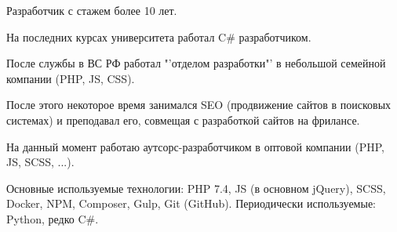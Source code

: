 \documentclass[10pt]{tpl/developercv} %
\begin{document}
\vspace{0.5cm}




\begin{minipage}[t]{0.45\textwidth} %
	\vspace{-\baselineskip} %

	Разработчик с стажем более 10 лет.
  \bigskip

  На последних курсах университета работал C\# разработчиком.

  После службы в ВС РФ работал "'отделом разработки"' в небольшой семейной компании (PHP, JS, CSS).

  После этого некоторое время занимался SEO (продвижение сайтов в поисковых системах) и преподавал его, совмещая с разработкой сайтов на фрилансе.

  На данный момент работаю аутсорс-разработчиком в оптовой компании (PHP, JS, SCSS, ...).

	Основные используемые технологии: {PHP 7.4,} {JS (в основном jQuery)}, SCSS, Docker, NPM, Composer, Gulp, {Git (GitHub)}.
	Периодически используемые: Python, редко C\#.
\end{minipage}
\hfill %
\begin{minipage}[t]{0.5\textwidth} %
	\vspace{-\baselineskip} %
	\begin{barchart}{5.5}
	\end{barchart}
\end{minipage}

\begin{center}
\end{center}

\end{document}
